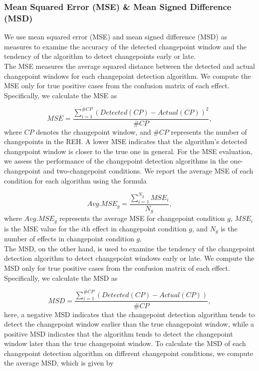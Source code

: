 \documentclass[]{interact}
\theoremstyle{plain}%
\theoremstyle{definition}
\theoremstyle{remark}
\begin{document}
	\subsubsection{Mean Squared Error (MSE) \& Mean Signed Difference (MSD)} \label{sec:MSE MSD}
	
	\hspace{0.28cm} We use mean squared error (MSE) and mean signed difference (MSD) as measures to examine the accuracy of the detected changepoint window and the tendency of the algorithm to detect changepoints early or late. \\
	
	The MSE measures the average squared distance between the detected and actual changepoint windows for each changepoint detection algorithm. We compute the MSE only for true positive cases from the confusion matrix of each effect. Specifically, we calculate the MSE as\cite{aminikhanghahiSurveyMethodsTime2017}
	
	\begin{equation} \label{9}
		MSE = \frac{\sum_{i = 1}^{\#CP} (Detected(CP) - Actual(CP))^2}{\#CP},
	\end{equation}
	where $CP$ denotes the changepoint window, and $\#CP$ represents the number of changepoints in the REH. A lower MSE indicates that the algorithm's detected changepoint window is closer to the true one in general. For the MSE evaluation, we assess the performance of the changepoint detection algorithms in the one-changepoint and two-changepoint conditions. We report the average MSE of each condition for each algorithm using the formula
	
	\begin{equation} \label{10}
		Avg.MSE_g = \frac{\sum_{i=1}^{N_g} MSE_i}{N_g},
	\end{equation}
	where $Avg.MSE_g$ represents the average MSE for changepoint condition $g$, $MSE_i$ is the MSE value for the $i$th effect in changepoint condition $g$, and $N_g$ is the number of effects in changepoint condition $g$. \\
	
	The MSD, on the other hand, is used to examine the tendency of the changepoint detection algorithm to detect changepoint windows early or late. We compute the MSD only for true positive cases from the confusion matrix of each effect. Specifically, we calculate the MSD as
	
	\begin{equation} \label{11}
		MSD = \frac{\sum_{i = 1}^{\#CP} (Detected(CP) - Actual(CP))}{\#CP},
	\end{equation}
	here, a negative MSD indicates that the changepoint detection algorithm tends to detect the changepoint window earlier than the true changepoint window, while a positive MSD indicates that the algorithm tends to detect the changepoint window later than the true changepoint window. To calculate the MSD of each changepoint detection algorithm on different changepoint conditions, we compute the average MSD, which is given by
	
\end{document}
